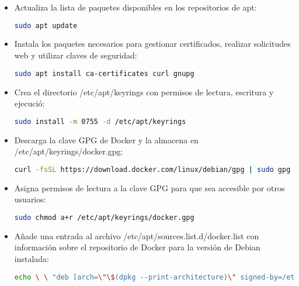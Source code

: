 		
		\begin{itemize}
			\item Actualiza la lista de paquetes disponibles en los repositorios de apt:
			
			\begin{lstlisting}[language=Bash, caption=docker]
			sudo apt update
			\end{lstlisting}
	
		\item Instala los paquetes necesarios para gestionar certificados, realizar solicitudes web y utilizar claves de seguridad:
			\begin{lstlisting}[language=Bash, caption=docker]
			sudo apt install ca-certificates curl gnupg
			\end{lstlisting}
	
		\item Crea el directorio /etc/apt/keyrings con permisos de lectura, escritura y ejecució:
			\begin{lstlisting}[language=Bash, caption=docker]
			sudo install -m 0755 -d /etc/apt/keyrings
			\end{lstlisting}
	
		\item Descarga la clave GPG de Docker y la almacena en /etc/apt/keyrings/docker.gpg:
			\begin{lstlisting}[language=Bash, caption=docker]
			curl -fsSL https://download.docker.com/linux/debian/gpg | sudo gpg --dearmor -o /etc/apt/keyrings/docker.gpg
			\end{lstlisting}
		
		\item Asigna permisos de lectura a la clave GPG para que sea accesible por otros usuarios:
			\begin{lstlisting}[language=Bash, caption=docker]
			sudo chmod a+r /etc/apt/keyrings/docker.gpg
			\end{lstlisting}
		
		\item Añade una entrada al archivo /etc/apt/sources.list.d/docker.list con información sobre el repositorio de Docker para la versión de Debian instalada:
			
			\begin{lstlisting}[language=Bash, caption=docker]
			echo \ \ "deb [arch=\"\$(dpkg --print-architecture)\" signed-by=/etc/apt/keyrings/docker.gpg] https://download.docker.com/linux/debian \ \ \"\$(. /etc/os-release \&\& echo \"\$VERSION_CODENAME\")\" stable" | sudo tee /etc/apt/sources.list.d/docker.list > /dev/null
			\end{lstlisting}
		

\end{itemize}
